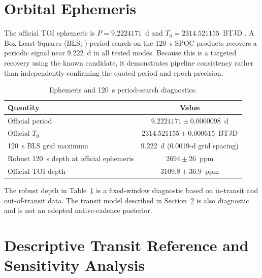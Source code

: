 \documentclass[11pt]{article}
\begin{document}
\section{Orbital Ephemeris}

The official TOI ephemeris is $P = 9.2224171$~d and
$T_0 = 2314.521155$~BTJD \citep{NASAExoplanetArchiveTOI}.  A Box
Least-Squares (BLS; \citealt{Kovacs2002}) period search on the 120~s SPOC
products recovers a periodic signal near 9.222~d in all tested modes.
Because this is a targeted recovery using the known candidate, it demonstrates
pipeline consistency rather than independently confirming the quoted period
and epoch precision.

\begin{table}[ht]
\centering
\caption{Ephemeris and 120~s period-search diagnostics.}
\label{tab:ephemeris}
\begin{tabular}{lc}
\toprule
Quantity & Value \\
\midrule
Official period             & $9.2224171 \pm 0.0000098$~d \\
Official $T_0$              & $2314.521155 \pm 0.000615$~BTJD \\
120~s BLS grid maximum      & 9.222~d (0.0019-d grid spacing) \\
Robust 120~s depth at official ephemeris & $2694 \pm 26$~ppm \\
Official TOI depth          & $3109.8 \pm 36.9$~ppm \\
\bottomrule
\end{tabular}
\end{table}

The robust depth in Table~\ref{tab:ephemeris} is a fixed-window diagnostic
based on in-transit and out-of-transit data.  The transit model described in
Section~\ref{sec:model} is also diagnostic and is not an adopted native-cadence
posterior.

\section{Descriptive Transit Reference and Sensitivity Analysis}
\label{sec:model}
\end{document}

